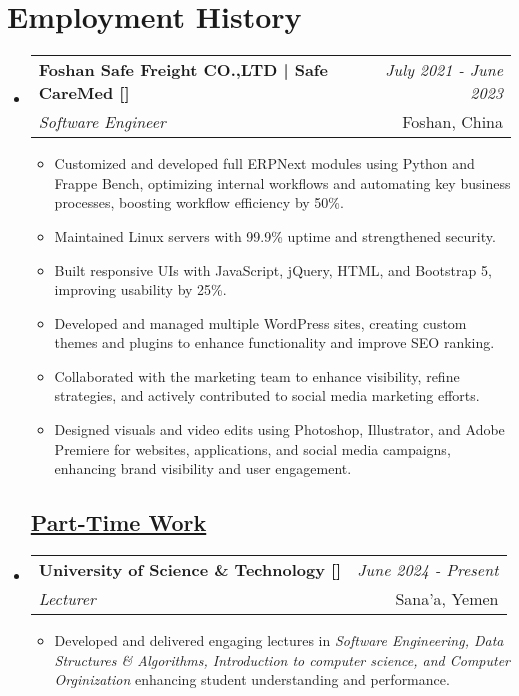 \documentclass[a4paper,11pt]{article}
\makeatletter
\newcommand{\resumeSubheading}[4]{
	\vspace{0.5mm}\item
	\begin{tabular*}{0.98\textwidth}[t]{l@{\extracolsep{\fill}}r}
		\textbf{#1} & \textit{\footnotesize{#4}} \\
		\textit{\footnotesize{#3}} &  \footnotesize{#2}\\
	\end{tabular*}
	\vspace{-1.0mm}
}
\newcommand{\resumeSubHeadingListStart}{\begin{itemize}[leftmargin=*,labelsep=1mm]}
\newcommand{\resumeItemListStart}{\begin{itemize}[leftmargin=*,labelsep=1mm,itemsep=0.5mm]}
\newcommand{\resumeSubHeadingListEnd}{\end{itemize}\vspace{2mm}}
\newcommand{\resumeItemListEnd}{\end{itemize}\vspace{-2mm}}
\makeatother
\begin{document}
	\section{\textbf{Employment History}}
	\vspace{2mm}

	\resumeSubHeadingListStart

	\subsection*{\underline{Full-Time Work}}
	\vspace{-1mm}

	\resumeSubheading
	{Foshan Safe Freight CO.,LTD | Safe CareMed [\href{https://www.safecaremd.com/}{\faIcon{globe}}]}{Foshan, China}
	{Software Engineer}{July 2021 - June 2023}
	\resumeItemListStart
	\item Customized and developed full ERPNext modules using Python and Frappe Bench, optimizing internal workflows and automating key business processes, boosting workflow efficiency by 50\%.
	\item Maintained Linux servers with 99.9\% uptime and strengthened security.
	\item Built responsive UIs with JavaScript, jQuery, HTML, and Bootstrap 5, improving usability by 25\%.
	\item Developed and managed multiple WordPress sites, creating custom themes and plugins to enhance functionality and improve SEO ranking.
	\item Collaborated with the marketing team to enhance visibility, refine strategies, and actively contributed to social media marketing efforts.
	\item Designed visuals and video edits using Photoshop, Illustrator, and Adobe Premiere for websites, applications, and social media campaigns, enhancing brand visibility and user engagement.
	\resumeItemListEnd
	
	\vspace{-3mm}
	\subsection*{\underline{Part-Time Work}}
	\vspace{-3mm}

	\resumeSubheading
	{{University of Science \& Technology [\href{https://ust.edu.ye/cit/}{\faIcon{globe}}]}}{Sana'a, Yemen}
	{Lecturer}{June 2024 - Present}
	\resumeItemListStart
    \item Developed and delivered engaging lectures in \emph{Software Engineering, Data Structures \& Algorithms, Introduction to computer science, and Computer Orginization} enhancing student understanding and performance.
	\resumeItemListEnd
	\vspace{-3mm}
	\resumeSubHeadingListEnd
\end{document}
